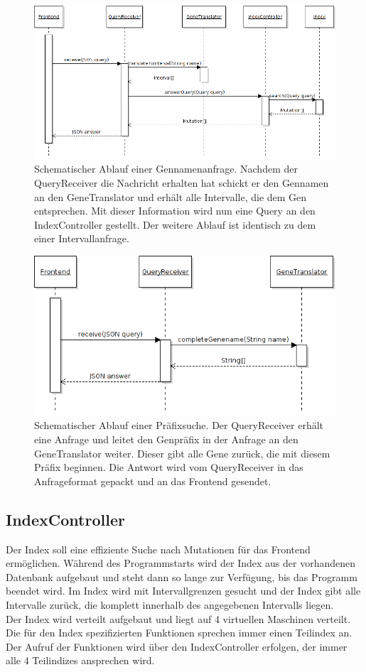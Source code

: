 \begin{figure}[H]
\includegraphics[width=1\textwidth]{middleware/namesearch_seq.png}
\caption{Schematischer Ablauf einer Gennamenanfrage. Nachdem der QueryReceiver die Nachricht erhalten hat schickt er den Gennamen an den GeneTranslator und erhält alle Intervalle, die dem Gen entsprechen. Mit dieser Information wird nun eine Query an den IndexController gestellt. Der weitere Ablauf ist identisch zu dem einer Intervallanfrage.}
\end{figure}
\begin{figure}[H]
\includegraphics[width=1\textwidth]{middleware/prefix_seq.png}
\caption{Schematischer Ablauf einer Präfixsuche. Der QueryReceiver erhält eine Anfrage und leitet den Genpräfix in der Anfrage an den GeneTranslator weiter. Dieser gibt alle Gene zurück, die mit diesem Präfix beginnen. Die Antwort wird vom QueryReceiver in das Anfrageformat gepackt und an das Frontend gesendet.}
\end{figure}

\subsection{IndexController}
Der Index soll eine effiziente Suche nach Mutationen für das Frontend ermöglichen. Während des Programmstarts wird der Index aus der vorhandenen Datenbank aufgebaut und steht dann so lange zur Verfügung, bis das Programm beendet wird.
Im Index wird mit Intervallgrenzen gesucht und der Index gibt alle Intervalle zurück, die komplett innerhalb des angegebenen Intervalls liegen.\\
Der Index wird verteilt aufgebaut und liegt auf 4 virtuellen Maschinen verteilt. Die für den Index spezifizierten Funktionen sprechen immer einen Teilindex an. Der Aufruf der Funktionen wird über den IndexController erfolgen, der immer alle 4 Teilindizes ansprechen wird.
